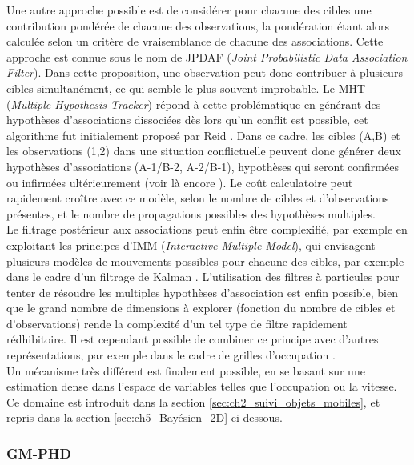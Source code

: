 Une autre approche possible est de considérer pour chacune des cibles une contribution pondérée de chacune des observations, la pondération étant alors calculée selon un critère de vraisemblance de chacune des associations. Cette approche est connue sous le nom de JPDAF (\emph{Joint Probabilistic Data Association Filter}). Dans cette proposition, une observation peut donc contribuer à plusieurs cibles simultanément, ce qui semble le plus souvent improbable. Le MHT (\emph{Multiple Hypothesis Tracker}) répond à cette problématique en générant des hypothèses d'associations dissociées dès lors qu'un conflit est possible, cet algorithme fut initialement proposé par Reid \cite{Reid1979}. Dans ce cadre, les cibles (A,B) et les observations (1,2) dans une situation conflictuelle peuvent donc générer deux hypothèses d'associations (A-1/B-2, A-2/B-1), hypothèses qui seront confirmées ou infirmées ultérieurement (voir là encore \cite{Blackman2004}). Le coût calculatoire peut rapidement croître avec ce modèle, selon le nombre de cibles et d'observations présentes, et le nombre de propagations possibles des hypothèses multiples.\\

Le filtrage postérieur aux associations peut enfin être complexifié, par exemple en exploitant les principes d'IMM (\emph{Interactive Multiple Model}), qui envisagent plusieurs modèles de mouvements possibles pour chacune des cibles, par exemple dans le cadre d'un filtrage de Kalman \cite{Mazor}. L'utilisation des filtres à particules pour tenter de résoudre les multiples hypothèses d'association est enfin possible, bien que le grand nombre de dimensions à explorer (fonction du nombre de cibles et d'observations) rende la complexité d'un tel type de filtre rapidement rédhibitoire. Il est cependant possible de combiner ce principe avec d'autres représentations, par exemple dans le cadre de grilles d'occupation \cite{Danescu}.\\
Un mécanisme très différent est finalement possible, en se basant sur une estimation dense dans l'espace de variables telles que l'occupation ou la vitesse. Ce domaine est introduit dans la section \ref{sec:ch2_suivi_objets_mobiles}, et repris dans la section \ref{sec:ch5_Bayésien_2D} ci-dessous.

\subsubsection{GM-PHD} \label{sec:ch5_GMPHD}
